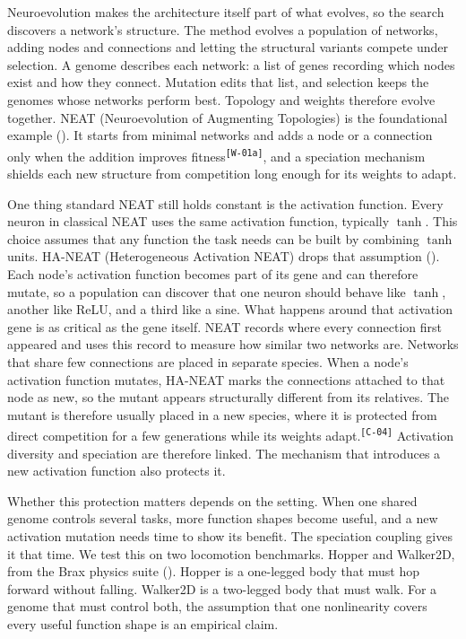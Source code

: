 \documentclass[12pt]{article}
\newcommand{\revID}[1]{\textsuperscript{\scriptsize\texttt{[#1]}}}
\newcommand{\revWrong}[2]{\textcolor{revRed}{#2}\revID{#1}}
\newcommand{\revWeak}[2]{\textcolor{revOrange}{#2}\revID{#1}}
\begin{document}
Neuroevolution makes the architecture itself part of what evolves, so the search discovers a network's structure.
The method evolves a population of networks, adding nodes and connections and letting the structural variants compete under selection.
A genome describes each network: a list of genes recording which nodes exist and how they connect.
Mutation edits that list, and selection keeps the genomes whose networks perform best.
Topology and weights therefore evolve together.
NEAT (Neuroevolution of Augmenting Topologies) is the foundational example (\cite{stanley_evolving_2002}).
It starts from minimal networks and \revWrong{W-01a}{adds a node or a connection only when the addition improves fitness}, and a speciation mechanism shields each new structure from competition long enough for its weights to adapt.


One thing standard NEAT still holds constant is the activation function.
Every neuron in classical NEAT uses the same activation function, typically $\tanh$.
This choice assumes that any function the task needs can be built by combining $\tanh$ units.
HA-NEAT (Heterogeneous Activation NEAT) drops that assumption (\cite{hagg_evolving_2017}).
Each node's activation function becomes part of its gene and can therefore mutate, so a population can discover that one neuron should behave like $\tanh$, another like ReLU, and a third like a sine.
What happens around that activation gene is as critical as the gene itself.
NEAT records where every connection first appeared and uses this record to measure how similar two networks are. Networks that share few connections are placed in separate species.
When a node's activation function mutates, HA-NEAT marks the connections attached to that node as new, so the mutant appears structurally different from its relatives.
\revWeak{C-04}{The mutant is therefore usually placed in a new species, where it is protected from direct competition for a few generations while its weights adapt.}
Activation diversity and speciation are therefore linked. The mechanism that introduces a new activation function also protects it.

Whether this protection matters depends on the setting.
When one shared genome controls several tasks, more function shapes become useful, and a new activation mutation needs time to show its benefit.
The speciation coupling gives it that time.
We test this on two locomotion benchmarks. Hopper and Walker2D, from the Brax physics suite (\cite{freeman_brax_2021}).
Hopper is a one-legged body that must hop forward without falling. Walker2D is a two-legged body that must walk.
For a genome that must control both, the assumption that one nonlinearity covers every useful function shape is an empirical claim.
\end{document}
